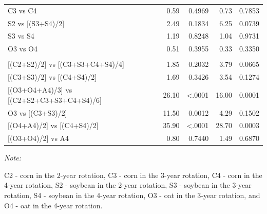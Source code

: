 \documentclass[
]{article}
\begin{document}
\begin{table}
\begin{threeparttable}
\begin{tabular}[t]{lrrrrrr}
\hspace{1em}\hspace{1em}C3 vs C4 &  &  & 0.59 & 0.4969 & 0.73 & 0.7853\\
 
\hspace{1em}\hspace{1em}S2 vs [(S3+S4)/2] &  &  & 2.49 & 0.1834 & 6.25 & 0.0739\\
 
\hspace{1em}\hspace{1em}S3 vs S4 &  &  & 1.19 & 0.8248 & 1.04 & 0.9731\\
 
\hspace{1em}\hspace{1em}O3 vs O4 &  &  & 0.51 & 0.3955 & 0.33 & 0.3350\\
 
\addlinespace[0.3em]
\multicolumn{7}{l}{\textbf{(B3) - Crop type effects}}\\
\hspace{1em}\hspace{1em}{}[(C2+S2)/2] vs [(C3+S3+C4+S4)/4] &  &  & 1.85 & 0.2032 & 3.79 & 0.0665\\
 
\hspace{1em}\hspace{1em}{}[(C3+S3)/2] vs [(C4+S4)/2] &  &  & 1.69 & 0.3426 & 3.54 & 0.1274\\
 
\hspace{1em}\hspace{1em}{}[(O3+O4+A4)/3] vs [(C2+S2+C3+S3+C4+S4)/6] &  &  & 26.10 & <.0001 & 16.00 & 0.0001\\
 
\hspace{1em}\hspace{1em}O3 vs [(C3+S3)/2] &  &  & 11.50 & 0.0012 & 4.29 & 0.1502\\
 
\hspace{1em}\hspace{1em}{}[(O4+A4)/2] vs [(C4+S4)/2] &  &  & 35.90 & <.0001 & 28.70 & 0.0003\\
 
\hspace{1em}\hspace{1em}{}[(O3+O4)/2] vs A4 &  &  & 0.80 & 0.7440 & 1.49 & 0.6870\\
\bottomrule
\end{tabular}
\begin{tablenotes}[para]
\item \textit{Note: } 
\item C2 - corn in the 2-year rotation, C3 - corn in the 3-year rotation, C4 - corn in the 4-year rotation, S2 - soybean in the 2-year rotation, S3 - soybean in the 3-year rotation, S4 - soybean in the 4-year rotation, O3 - oat in the 3-year rotation, and O4 - oat in the 4-year rotation.
\end{tablenotes}
\end{threeparttable}
\end{table}
\end{document}
